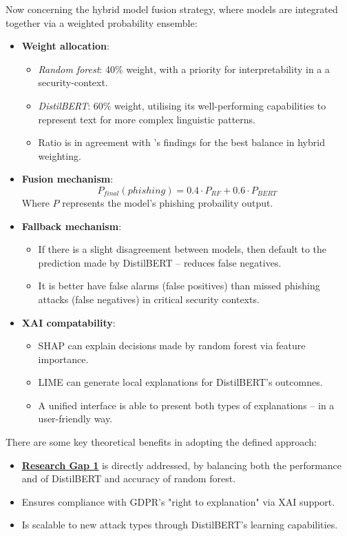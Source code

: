 \noindent Now concerning the hybrid model fusion strategy, where models are integrated together via a weighted probability ensemble:

\begin{itemize}
  \item \textbf{Weight allocation}:
  \begin{itemize}
    \item \textit{Random forest}: 40\% weight, with a priority for interpretability in a a security-context.
    \item \textit{DistilBERT}: 60\% weight, utilising its well-performing capabilities to represent text for more complex linguistic patterns.
    \item Ratio is in agreement with \cite{alzahrani2024explainable}'s findings for the best balance in hybrid weighting.
  \end{itemize}
  \item \textbf{Fusion mechanism}:
  \begin{equation}
    P_{final}(phishing) = 0.4 \cdot P_{RF} + 0.6 \cdot P_{BERT}
  \end{equation}
  Where \( P \) represents the model's phishing probaility output.
  \item \textbf{Fallback mechanism}:
  \begin{itemize}
    \item If there is a slight disagreement between models, then default to the prediction made by DistilBERT -- reduces false negatives.
    \item It is better have false alarms (false positives) than missed phishing attacks (false negatives) in critical security contexts.
  \end{itemize}
  \item \textbf{XAI compatability}:
  \begin{itemize}
    \item SHAP can explain decisions made by random forest via feature importance.
    \item LIME can generate local explanations for DistilBERT's outcomnes.
    \item A unified interface is able to present both types of explanations -- in a user-friendly way.
  \end{itemize}
\end{itemize}

\noindent There are some key theoretical benefits in adopting the defined approach:

\begin{itemize}
  \item \hyperref[research-gap-1]{\uline{\textbf{Research Gap 1}}} is directly addressed, by balancing both the performance and of DistilBERT and accuracy of random forest.
  \item Ensures compliance with GDPR's "right to explanation" via XAI support.
  \item Is scalable to new attack types through DistilBERT's learning capabilities.
\end{itemize}
